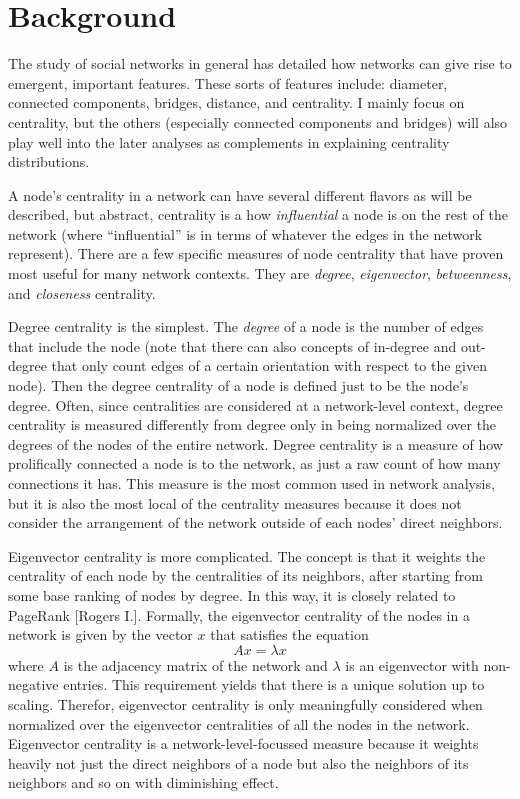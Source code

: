 \documentclass{article}
\renewcommand{\it}{\textit}
\begin{document}
\section{Background}
\label{sec:background}

The study of social networks in general has detailed how networks can give rise to emergent, important features.
These sorts of features include: diameter, connected components, bridges, distance, and centrality.
I mainly focus on centrality, but the others (especially connected components and bridges) will also play well into the later analyses as complements in explaining centrality distributions.

A node's centrality in a network can have several different flavors as will be described, but abstract, centrality is a how \it{influential} a node is on the rest of the network (where ``influential'' is in terms of whatever the edges in the network represent).
There are a few specific measures of node centrality that have proven most useful for many network contexts.
They are \it{degree}, \it{eigenvector}, \it{betweenness}, and \it{closeness} centrality.

Degree centrality is the simplest.
The \it{degree} of a node is the number of edges that include the node (note that there can also concepts of in-degree and out-degree that only count edges of a certain orientation with respect to the given node).
Then the degree centrality of a node is defined just to be the node's degree.
Often, since centralities are considered at a network-level context, degree centrality is measured differently from degree only in being normalized over the degrees of the nodes of the entire network.
Degree centrality is a measure of how prolifically connected a node is to the network, as just a raw count of how many connections it has.
This measure is the most common used in network analysis, but it is also the most local of the centrality measures because it does not consider the arrangement of the network outside of each nodes' direct neighbors.

Eigenvector centrality is more complicated.
The concept is that it weights the centrality of each node by the centralities of its neighbors, after starting from some base ranking of nodes by degree.
In this way, it is closely related to PageRank [Rogers I.].
Formally, the eigenvector centrality of the nodes in a network is given by the vector $x$ that satisfies the equation $$ A x = \lambda x $$ where $A$ is the adjacency matrix of the network and $\lambda$ is an eigenvector with non-negative entries.
This requirement yields that there is a unique solution up to scaling. Therefor, eigenvector centrality is only meaningfully considered when normalized over the eigenvector centralities of all the nodes in the network.
Eigenvector centrality is a network-level-focussed measure because it weights heavily not just the direct neighbors of a node but also the neighbors of its neighbors and so on with diminishing effect.
\end{document}

